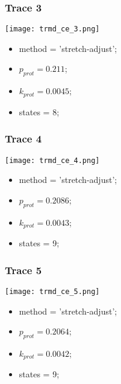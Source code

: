 \subsubsection{Trace 3}
\begin{minipage}[c]{0.7\textwidth}
	\texttt{[image: trmd\_ce\_3.png]}
\end{minipage}
\hfill
\begin{minipage}[c]{0.45\textwidth}
	\begin{itemize}
		\item method = 'stretch-adjust';
		\item $p_{prot}=0.211$;
		\item $k_{prot}=0.0045$;
		\item states = 8;
	\end{itemize}
\end{minipage}

\subsubsection{Trace 4}
\begin{minipage}[c]{0.7\textwidth}
	\texttt{[image: trmd\_ce\_4.png]}
\end{minipage}
\hfill
\begin{minipage}[c]{0.45\textwidth}
	\begin{itemize}
		\item method = 'stretch-adjust';
		\item $p_{prot}=0.2086$;
		\item $k_{prot}=0.0043$;
		\item states = 9;
	\end{itemize}
\end{minipage}

\subsubsection{Trace 5}
\begin{minipage}[c]{0.7\textwidth}
	\texttt{[image: trmd\_ce\_5.png]}
\end{minipage}
\hfill
\begin{minipage}[c]{0.45\textwidth}
	\begin{itemize}
		\item method = 'stretch-adjust';
		\item $p_{prot}=0.2064$;
		\item $k_{prot}=0.0042$;
		\item states = 9;
	\end{itemize}
\end{minipage}


